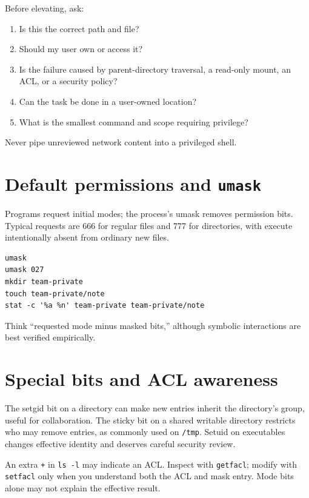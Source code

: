 \documentclass[11pt,oneside,openany]{book}
\begin{document}
Before elevating, ask:
\begin{enumerate}
  \item Is this the correct path and file?
  \item Should my user own or access it?
  \item Is the failure caused by parent-directory traversal, a read-only mount, an ACL, or a security policy?
  \item Can the task be done in a user-owned location?
  \item What is the smallest command and scope requiring privilege?
\end{enumerate}
Never pipe unreviewed network content into a privileged shell.

\section{Default permissions and \texttt{umask}}
Programs request initial modes; the process's umask removes permission bits. Typical requests are 666 for regular files and 777 for directories, with execute intentionally absent from ordinary new files.
\begin{lstlisting}
umask
umask 027
mkdir team-private
touch team-private/note
stat -c '%a %n' team-private team-private/note
\end{lstlisting}
Think “requested mode minus masked bits,” although symbolic interactions are best verified empirically.

\section{Special bits and ACL awareness}
The setgid bit on a directory can make new entries inherit the directory's group, useful for collaboration. The sticky bit on a shared writable directory restricts who may remove entries, as commonly used on \texttt{/tmp}. Setuid on executables changes effective identity and deserves careful security review.

An extra \texttt{+} in \texttt{ls -l} may indicate an ACL. Inspect with \texttt{getfacl}; modify with \texttt{setfacl} only when you understand both the ACL and mask entry. Mode bits alone may not explain the effective result.
\end{document}
